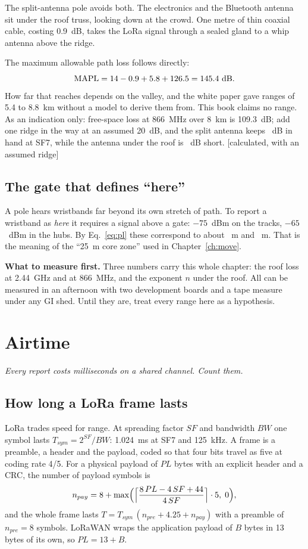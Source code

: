 \documentclass[11pt,a4paper,twoside,openany]{book}
\newcommand{\hook}[1]{{\noindent\fontsize{13}{19}\selectfont\itshape\color{rsmuted}#1\par}\vspace{12pt}}
\newcommand{\lbl}[1]{\textsf{\footnotesize\color{rsmuted}[#1]}}
\begin{document}
The split-antenna pole avoids both. The electronics and the Bluetooth antenna sit under the roof truss, looking down
at the crowd. One metre of thin coaxial cable, costing 0.9~dB, takes the LoRa signal through a sealed gland to a whip
antenna above the ridge.

The maximum allowable path loss follows directly:
\[\mathrm{MAPL}=14-0.9+5.8+126.5=\Mapl\ \mathrm{dB}.\]
How far that reaches depends on the valley, and the white paper gave ranges of 5.4 to 8.8~km without a model to derive
them from. This book claims no range. As an indication only: free-space loss at 866~MHz over 8~km is 109.3~dB; add one
ridge in the way at an assumed 20~dB, and the split antenna keeps \MarginEightOver~dB in hand at SF7, while the antenna
under the roof is \MarginEightUnder~dB short. \lbl{calculated, with an assumed ridge}

\section{The gate that defines ``here''}
A pole hears wristbands far beyond its own stretch of path. To report a wristband as \emph{here} it requires a signal
above a gate: $-75$~dBm on the tracks, $-65$~dBm in the hubs. By Eq.~\ref{eq:pl} these correspond to about
\GateTrackM~m and \GateHubM~m. That is the meaning of the ``25~m core zone'' used in Chapter~\ref{ch:move}.

\begin{finding}\textbf{What to measure first.} Three numbers carry this whole chapter: the roof loss at 2.44~GHz and at
866~MHz, and the exponent $n$ under the roof. All can be measured in an afternoon with two development boards and a
tape measure under any GI shed. Until they are, treat every range here as a hypothesis.\end{finding}

\chapter{Airtime}\label{ch:air}
\hook{Every report costs milliseconds on a shared channel. Count them.}
\section{How long a LoRa frame lasts}
LoRa trades speed for range. At spreading factor $SF$ and bandwidth $BW$ one symbol lasts
$T_{sym}=2^{SF}/BW$: 1.024~ms at SF7 and 125~kHz. A frame is a preamble, a header and the payload, coded so that
four bits travel as five at coding rate 4/5. For a physical payload of $PL$ bytes with an explicit header and a CRC,
the number of payload symbols is
\begin{equation}n_{pay}=8+\max\Bigl(\Bigl\lceil\frac{8\,PL-4\,SF+44}{4\,SF}\Bigr\rceil\cdot5,\;0\Bigr),\end{equation}
and the whole frame lasts $T=T_{sym}\,(n_{pre}+4.25+n_{pay})$ with a preamble of $n_{pre}=8$ symbols. LoRaWAN wraps the
application payload of $B$ bytes in 13 bytes of its own, so $PL=13+B$.
\end{document}
